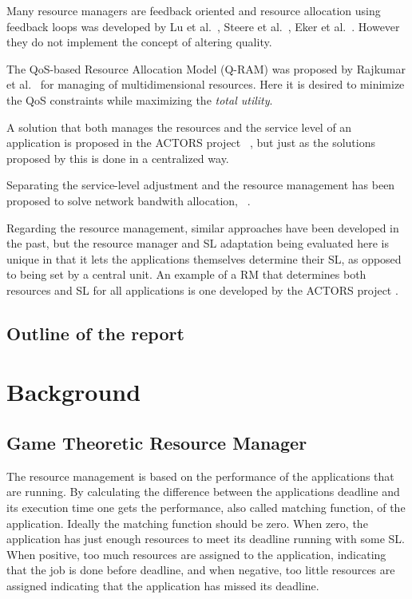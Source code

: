 \documentclass[nobiblatex]{LTHthesis}
\newcommand{\martina}[1]{\todo[inline,color=red!30,caption={}]{\textbf{Martina:} #1}}
\begin{document}
Many resource managers are feedback oriented and resource allocation using feedback loops was developed by Lu et al.~\cite{LuS99a},
Steere et al.~\cite{Ste99}, Eker et al.~\cite{Eke00}. However they do not implement the concept of altering quality.

The QoS-based Resource Allocation Model (Q-RAM) was proposed by Rajkumar et al.~\cite{Raj97a} for managing of multidimensional resources. Here it is desired to minimize the QoS constraints while maximizing the \emph{total utility}. 
 
A solution that both manages the resources and the service level of an application is proposed in the ACTORS project ~\cite{Bin11}, but just as the solutions proposed by \cite{Raj97a,Soj11,Arz11} this is done in a centralized way. 

Separating the service-level adjustment and the resource management has been proposed to solve network bandwith allocation, ~\cite{Sil11}.


\martina{End of rephrase}


Regarding the resource management, similar approaches have been developed in the past, but the resource manager and SL adaptation being evaluated here is unique in that it lets the applications themselves determine their SL, as opposed to being set by a central unit. An example of a RM that determines both resources and SL for all applications is one developed by the ACTORS project  \cite{actors1}.  


\section{Outline of the report}

\chapter{Background}

\section{Game Theoretic Resource Manager}
The resource management is based on the performance of the applications that are running. By calculating the difference between the applications deadline and its execution time one gets the performance, also called matching function, of the application. Ideally the matching function should be zero. When zero, the  application has just enough resources to meet its deadline running with some SL. When positive, too much resources are assigned to the application, indicating that the job is done before deadline, and when negative, too little resources are assigned indicating that the application has missed its deadline.
\end{document}
